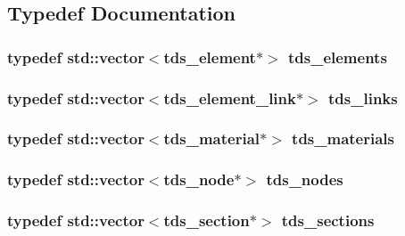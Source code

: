 \subsection{Typedef Documentation}
\hypertarget{tds__parts_8hh_af35ca3b18f7ed6e38a9bfb5639d5a23e}{
\subsubsection[{tds\-\_\-elements}]{\setlength{\rightskip}{0pt plus 5cm}typedef std\-::vector$<${\bf tds\-\_\-element}$\ast$$>$ {\bf tds\-\_\-elements}}}\label{tds__parts_8hh_af35ca3b18f7ed6e38a9bfb5639d5a23e}
\hypertarget{tds__parts_8hh_a5d3b1cd92297b3ee827cdf0fff431aef}{
\subsubsection[{tds\-\_\-links}]{\setlength{\rightskip}{0pt plus 5cm}typedef std\-::vector$<${\bf tds\-\_\-element\-\_\-link}$\ast$$>$ {\bf tds\-\_\-links}}}\label{tds__parts_8hh_a5d3b1cd92297b3ee827cdf0fff431aef}
\hypertarget{tds__parts_8hh_a972ae401709b50fd79befb06dd952170}{
\subsubsection[{tds\-\_\-materials}]{\setlength{\rightskip}{0pt plus 5cm}typedef std\-::vector$<${\bf tds\-\_\-material}$\ast$$>$ {\bf tds\-\_\-materials}}}\label{tds__parts_8hh_a972ae401709b50fd79befb06dd952170}
\hypertarget{tds__parts_8hh_ad445cf91d41fc0e37fcaf259adec00ef}{
\subsubsection[{tds\-\_\-nodes}]{\setlength{\rightskip}{0pt plus 5cm}typedef std\-::vector$<${\bf tds\-\_\-node}$\ast$$>$ {\bf tds\-\_\-nodes}}}\label{tds__parts_8hh_ad445cf91d41fc0e37fcaf259adec00ef}
\hypertarget{tds__parts_8hh_aef503d0ac251112b915fc3a8918962f2}{
\subsubsection[{tds\-\_\-sections}]{\setlength{\rightskip}{0pt plus 5cm}typedef std\-::vector$<${\bf tds\-\_\-section}$\ast$$>$ {\bf tds\-\_\-sections}}}\label{tds__parts_8hh_aef503d0ac251112b915fc3a8918962f2}
